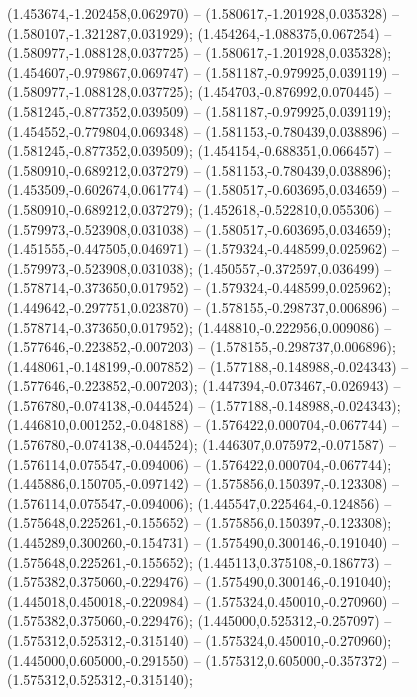  (1.453674,-1.202458,0.062970) -- (1.580617,-1.201928,0.035328) -- (1.580107,-1.321287,0.031929);
 (1.454264,-1.088375,0.067254) -- (1.580977,-1.088128,0.037725) -- (1.580617,-1.201928,0.035328);
 (1.454607,-0.979867,0.069747) -- (1.581187,-0.979925,0.039119) -- (1.580977,-1.088128,0.037725);
 (1.454703,-0.876992,0.070445) -- (1.581245,-0.877352,0.039509) -- (1.581187,-0.979925,0.039119);
 (1.454552,-0.779804,0.069348) -- (1.581153,-0.780439,0.038896) -- (1.581245,-0.877352,0.039509);
 (1.454154,-0.688351,0.066457) -- (1.580910,-0.689212,0.037279) -- (1.581153,-0.780439,0.038896);
 (1.453509,-0.602674,0.061774) -- (1.580517,-0.603695,0.034659) -- (1.580910,-0.689212,0.037279);
 (1.452618,-0.522810,0.055306) -- (1.579973,-0.523908,0.031038) -- (1.580517,-0.603695,0.034659);
 (1.451555,-0.447505,0.046971) -- (1.579324,-0.448599,0.025962) -- (1.579973,-0.523908,0.031038);
 (1.450557,-0.372597,0.036499) -- (1.578714,-0.373650,0.017952) -- (1.579324,-0.448599,0.025962);
 (1.449642,-0.297751,0.023870) -- (1.578155,-0.298737,0.006896) -- (1.578714,-0.373650,0.017952);
 (1.448810,-0.222956,0.009086) -- (1.577646,-0.223852,-0.007203) -- (1.578155,-0.298737,0.006896);
 (1.448061,-0.148199,-0.007852) -- (1.577188,-0.148988,-0.024343) -- (1.577646,-0.223852,-0.007203);
 (1.447394,-0.073467,-0.026943) -- (1.576780,-0.074138,-0.044524) -- (1.577188,-0.148988,-0.024343);
 (1.446810,0.001252,-0.048188) -- (1.576422,0.000704,-0.067744) -- (1.576780,-0.074138,-0.044524);
 (1.446307,0.075972,-0.071587) -- (1.576114,0.075547,-0.094006) -- (1.576422,0.000704,-0.067744);
 (1.445886,0.150705,-0.097142) -- (1.575856,0.150397,-0.123308) -- (1.576114,0.075547,-0.094006);
 (1.445547,0.225464,-0.124856) -- (1.575648,0.225261,-0.155652) -- (1.575856,0.150397,-0.123308);
 (1.445289,0.300260,-0.154731) -- (1.575490,0.300146,-0.191040) -- (1.575648,0.225261,-0.155652);
 (1.445113,0.375108,-0.186773) -- (1.575382,0.375060,-0.229476) -- (1.575490,0.300146,-0.191040);
 (1.445018,0.450018,-0.220984) -- (1.575324,0.450010,-0.270960) -- (1.575382,0.375060,-0.229476);
 (1.445000,0.525312,-0.257097) -- (1.575312,0.525312,-0.315140) -- (1.575324,0.450010,-0.270960);
 (1.445000,0.605000,-0.291550) -- (1.575312,0.605000,-0.357372) -- (1.575312,0.525312,-0.315140);
